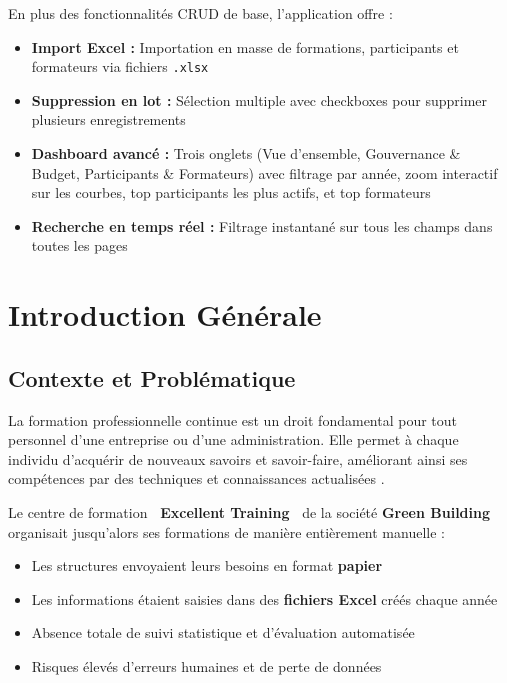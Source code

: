 \documentclass[12pt,a4paper]{report}
\begin{document}
\noindent En plus des fonctionnalit\'{e}s CRUD de base, l'application offre :
\begin{itemize}
  \item \textbf{Import Excel :} Importation en masse de formations, participants et formateurs via fichiers \texttt{.xlsx}
  \item \textbf{Suppression en lot :} S\'{e}lection multiple avec checkboxes pour supprimer plusieurs enregistrements
  \item \textbf{Dashboard avanc\'{e} :} Trois onglets (Vue d'ensemble, Gouvernance \& Budget, Participants \& Formateurs) avec filtrage par ann\'{e}e, zoom interactif sur les courbes, top participants les plus actifs, et top formateurs
  \item \textbf{Recherche en temps r\'{e}el :} Filtrage instantan\'{e} sur tous les champs dans toutes les pages
\end{itemize}

\clearpage

\chapter{Introduction G\'{e}n\'{e}rale}

\section{Contexte et Probl\'{e}matique}

La formation professionnelle continue est un droit fondamental pour tout personnel d'une entreprise ou d'une administration. Elle permet \`{a} chaque individu d'acqu\'{e}rir de nouveaux savoirs et savoir-faire, am\'{e}liorant ainsi ses comp\'{e}tences par des techniques et connaissances actualis\'{e}es \cite{cdc2026}.

Le centre de formation \textbf{\og ~Excellent Training~\fg{}} de la soci\'{e}t\'{e} \textbf{Green Building} organisait jusqu'alors ses formations de mani\`{e}re enti\`{e}rement manuelle :

\begin{itemize}
  \item Les structures envoyaient leurs besoins en format \textbf{papier}
  \item Les informations \'{e}taient saisies dans des \textbf{fichiers Excel} cr\'{e}\'{e}s chaque ann\'{e}e
  \item Absence totale de suivi statistique et d'\'{e}valuation automatis\'{e}e
  \item Risques \'{e}lev\'{e}s d'erreurs humaines et de perte de donn\'{e}es
\end{itemize}
\end{document}
